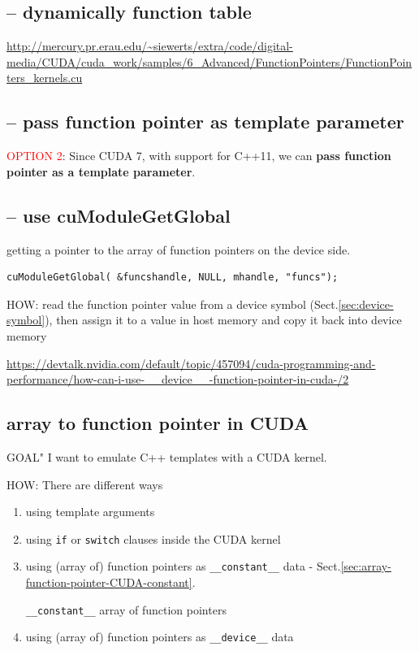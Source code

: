 \subsection{-- dynamically function table}

\url{http://mercury.pr.erau.edu/~siewerts/extra/code/digital-media/CUDA/cuda_work/samples/6_Advanced/FunctionPointers/FunctionPointers_kernels.cu}



\subsection{-- pass function pointer as template parameter}

\textcolor{red}{OPTION 2}:
Since CUDA 7, with support for C++11, we can {\bf pass function pointer as a template parameter}.


\subsection{-- use cuModuleGetGlobal}

 getting a pointer to the array of function pointers on the device side.
\begin{verbatim}
cuModuleGetGlobal( &funcshandle, NULL, mhandle, "funcs");
\end{verbatim}


HOW: read the function pointer value from a device symbol (Sect.\ref{sec:device-symbol}), then assign it to a
value in host memory and copy it back into device memory


\url{https://devtalk.nvidia.com/default/topic/457094/cuda-programming-and-performance/how-can-i-use-__device__-function-pointer-in-cuda-/2}

\subsection{array to function pointer in CUDA}

GOAL" I want to emulate C++ templates with a CUDA kernel.


HOW: There are different ways
\begin{enumerate}
  \item using template arguments
  
  \item using \verb!if! or \verb!switch! clauses inside the CUDA kernel
  
  \item using (array of) function pointers as \verb!__constant__! data
  - Sect.\ref{sec:array-function-pointer-CUDA-constant}.
  

\verb!__constant__! array of function pointers

  \item   using (array of) function pointers as \verb!__device__! data
\end{enumerate}

